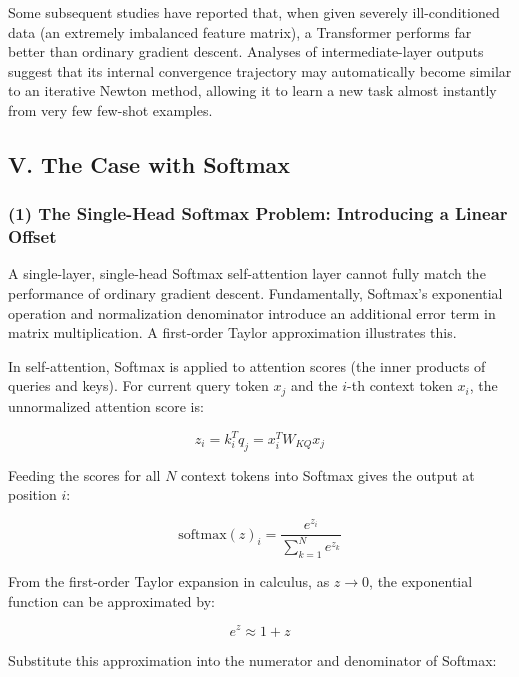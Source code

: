 Some subsequent studies have reported that, when given severely ill-conditioned data (an extremely imbalanced feature matrix), a Transformer performs far better than ordinary gradient descent. Analyses of intermediate-layer outputs suggest that its internal convergence trajectory may automatically become similar to an iterative Newton method, allowing it to learn a new task almost instantly from very few few-shot examples.

\hypertarget{v.-the-case-with-softmax}{%
\subsection{V. The Case with Softmax}\label{v.-the-case-with-softmax}}

\hypertarget{the-single-head-softmax-problem-introducing-a-linear-offset}{%
\subsubsection{(1) The Single-Head Softmax Problem: Introducing a Linear Offset}\label{the-single-head-softmax-problem-introducing-a-linear-offset}}

A single-layer, single-head Softmax self-attention layer cannot fully match the performance of ordinary gradient descent. Fundamentally, Softmax's exponential operation and normalization denominator introduce an additional error term in matrix multiplication. A first-order Taylor approximation illustrates this.

In self-attention, Softmax is applied to attention scores (the inner products of queries and keys). For current query token \(x_j\) and the \(i\)-th context token \(x_i\), the unnormalized attention score is:

\[
z_i = k_i^T q_j = x_i^T W_{KQ}x_j
\]

Feeding the scores for all \(N\) context tokens into Softmax gives the output at position \(i\):

\[
\mathrm{softmax}(z)_i = \frac{e^{z_i}}{\sum_{k=1}^{N} e^{z_k}}
\]

From the first-order Taylor expansion in calculus, as \(z \to 0\), the exponential function can be approximated by:

\[
e^z \approx 1 + z
\]

Substitute this approximation into the numerator and denominator of Softmax:

